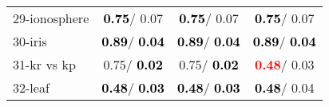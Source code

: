 \begin{table}[h]
\begin{center}
\begin{tabular}{lc|c|c}
29-ionosphere & \textcolor{black}{\textbf{  0.75}}/  0.07 & \textcolor{black}{\textbf{  0.75}}/  0.07 & \textcolor{black}{\textbf{  0.75}}/  0.07 \\
30-iris & \textcolor{black}{\textbf{  0.89}}/\textcolor{black}{\textbf{  0.04}} & \textcolor{black}{\textbf{  0.89}}/\textcolor{black}{\textbf{  0.04}} & \textcolor{black}{\textbf{  0.89}}/\textcolor{black}{\textbf{  0.04}} \\
31-kr vs kp &   0.75/\textcolor{black}{\textbf{  0.02}} &   0.75/\textcolor{black}{\textbf{  0.02}} & \textcolor{red}{\textbf{  0.48}}/  0.03 \\
32-leaf & \textcolor{black}{\textbf{  0.48}}/\textcolor{black}{\textbf{  0.03}} & \textcolor{black}{\textbf{  0.48}}/\textcolor{black}{\textbf{  0.03}} & \textcolor{black}{\textbf{  0.48}}/  0.04 \\\end{tabular}\label{stratsALCKappa0bNBRedux}
\end{center}
\end{table}
